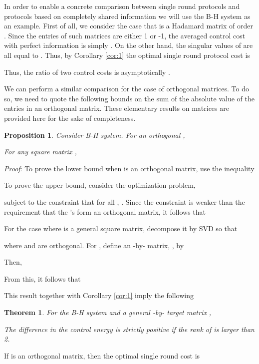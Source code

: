 \documentclass[12pt,onecolumn,draftcls]{IEEEtran}
\newtheorem{theorem}{Theorem}[section]
\newtheorem{proposition}{Proposition}[section]
\begin{document}
In order to enable a concrete comparison between single round protocols and protocols based on completely shared information we will use the B-H system as an example.  First of all, we consider the case that  is a Hadamard matrix of
order .  Since the entries of such matrices are either 1 or -1, the averaged control cost with perfect information
 is simply .  On the other hand, the singular values of  are all equal to .
Thus, by Corollary \ref{cor:1} the optimal single round protocol cost  is

Thus, the ratio of two control costs is asymptotically .

We can perform a similar comparison for the case of orthogonal matrices.   To do so, we need to quote the following bounds on the sum of the absolute
value of the entries in an orthogonal matrix.   These elementary results on matrices are provided here for the sake of completeness.

\begin{proposition}
Consider B-H system.  For an orthogonal ,

For any square matrix ,

\end{proposition}

\noindent
\textit{Proof}: \rm
To prove the lower bound when  is an orthogonal matrix, use the inequality

To prove the upper bound, consider the optimization problem,

subject to the constraint that for all ,
.
Since the constraint is weaker than the requirement that the 's form an orthogonal matrix,
it follows that

For the case where  is a general square matrix, decompose it by SVD so that

where  and  are orthogonal.
For , define an -by- matrix,  , by

Then,

From this, it follows that

\hfill 

This result together with Corollary \ref{cor:1} imply the following
\begin{theorem}
For the B-H system and a general -by- target matrix ,

The difference in the control energy is strictly positive if the rank of  is larger than 2.
\end{theorem}

If  is an orthogonal matrix, then the optimal single round cost  is
\end{document}
